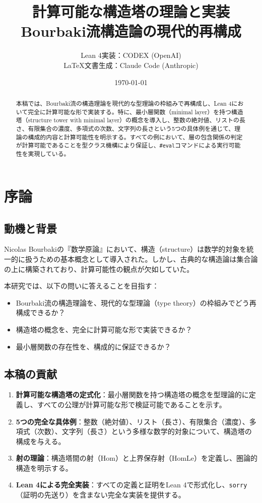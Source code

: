 \documentclass[a4paper,12pt]{ltjsarticle}
\title{計算可能な構造塔の理論と実装\\
\large Bourbaki流構造論の現代的再構成}
\author{
  Lean 4実装：CODEX (OpenAI)\\
  \LaTeX 文書生成：Claude Code (Anthropic)
}
\date{\today}
\theoremstyle{definition}
\begin{document}
\maketitle

\begin{abstract}
本稿では、Bourbaki流の構造理論を現代的な型理論の枠組みで再構成し、Lean 4において完全に計算可能な形で実装する。特に、最小層関数（minimal layer）を持つ構造塔（structure tower with minimal layer）の概念を導入し、整数の絶対値、リストの長さ、有限集合の濃度、多項式の次数、文字列の長さという5つの具体例を通じて、理論の構成的内容と計算可能性を明示する。すべての例において、層の包含関係の判定が計算可能であることを型クラス機構により保証し、\texttt{\#eval}コマンドによる実行可能性を実現している。
\end{abstract}

\tableofcontents

\section{序論}

\subsection{動機と背景}

Nicolas Bourbakiの『数学原論』において、構造（structure）は数学的対象を統一的に扱うための基本概念として導入された。しかし、古典的な構造論は集合論の上に構築されており、計算可能性の観点が欠如していた。

本研究では、以下の問いに答えることを目指す：

\begin{itemize}
\item Bourbaki流の構造理論を、現代的な型理論（type theory）の枠組みでどう再構成できるか？
\item 構造塔の概念を、完全に計算可能な形で実装できるか？
\item 最小層関数の存在性を、構成的に保証できるか？
\end{itemize}

\subsection{本稿の貢献}

\begin{enumerate}
\item \textbf{計算可能な構造塔の定式化}：最小層関数を持つ構造塔の概念を型理論的に定義し、すべての公理が計算可能な形で検証可能であることを示す。

\item \textbf{5つの完全な具体例}：整数（絶対値）、リスト（長さ）、有限集合（濃度）、多項式（次数）、文字列（長さ）という多様な数学的対象について、構造塔の構成を与える。

\item \textbf{射の理論}：構造塔間の射（Hom）と上界保存射（HomLe）を定義し、圏論的構造を明示する。

\item \textbf{Lean 4による完全実装}：すべての定義と証明をLean 4で形式化し、\texttt{sorry}（証明の先送り）を含まない完全な実装を提供する。
\end{enumerate}
\end{document}
